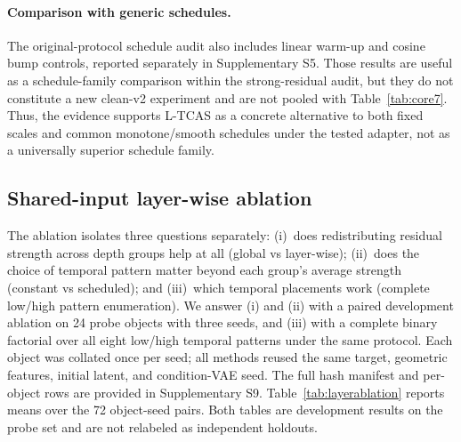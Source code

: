 \documentclass[times,twocolumn,final]{elsarticle}
\begin{document}
\paragraph{Comparison with generic schedules.}
The original-protocol schedule audit also includes linear warm-up and cosine
bump controls, reported separately in Supplementary S5. Those results are
useful as a schedule-family comparison within the strong-residual audit, but
they do not constitute a new clean-v2 experiment and are not pooled with
Table~\ref{tab:core7}. Thus, the evidence supports L-TCAS as a concrete
alternative to both fixed scales and common monotone/smooth schedules under
the tested adapter, not as a universally superior schedule family.

\FloatBarrier
\subsection{Shared-input layer-wise ablation}
\label{subsec:layerablation}

The ablation isolates three questions separately: (i)\ does redistributing
residual strength across depth groups help at all (global vs layer-wise);
(ii)\ does the choice of temporal pattern matter beyond each group's average
strength (constant vs scheduled); and (iii)\ which temporal placements work
(complete low/high pattern enumeration). We answer (i) and (ii) with a paired
development ablation on 24 probe objects with three seeds, and (iii) with a
complete binary factorial over all eight low/high temporal patterns under the
same protocol. Each object was collated once per seed; all methods reused the
same target, geometric features, initial latent, and condition-VAE seed. The
full hash manifest and per-object rows are provided in Supplementary S9.
Table~\ref{tab:layerablation} reports means over the 72 object-seed pairs.
Both tables are development results on the probe set and are not relabeled as
independent holdouts.
\end{document}
